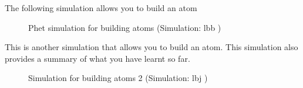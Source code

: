 \label{m38741*eip-816}The following simulation allows you to build an atom\newline
    \setcounter{subfigure}{0}
	\begin{figure}[H] %
    \textnormal{Phet simulation for building atoms}\vspace{.1in} \nopagebreak
  \label{m38806*phet!!!underscore!!!sim}\label{m38806*phet-simulation}
             { (Simulation:  lbb )}
      \vspace{2pt}
    \vspace{.1in}
 \end{figure}       
\par \label{m38741*eip-583}This is another simulation that allows you to build an atom. This simulation also provides a summary of what you have learnt so far. \newline
    \setcounter{subfigure}{0}
	\begin{figure}[H] %
    \textnormal{Simulation for building atoms 2}\vspace{.1in} \nopagebreak
  \label{m38806*phet!!!underscore!!!sim}\label{m38806*phet-simulation}
             { (Simulation:  lbj )}
      \vspace{2pt}
    \vspace{.1in}
 \end{figure}       
    \par 
    \label{m38741*cid10}
